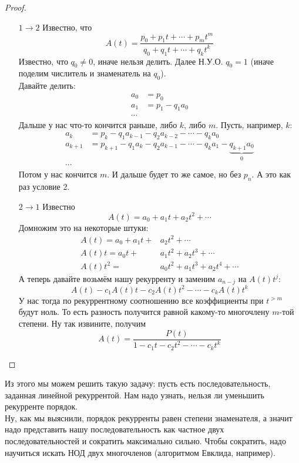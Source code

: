 \documentclass{article}
\begin{document}
    \begin{proof}
        \begin{itemize}
            \item[$1\to2$] Известно, что
            $$
            A(t)=\frac{p_0+p_1t+\cdots+p_mt^m}{q_0+q_1t+\cdots+q_kt^k}
            $$
            Известно, что $q_0\neq0$, иначе нельзя делить. Далее Н.У.О. $q_0=1$ (иначе поделим числитель и знаменатель на $q_0$).\\
            Давайте делить:
            \begin{align*}
                a_0&=p_0\\
                a_1&=p_1-q_1a_0\\
                \cdots&
            \end{align*}
            Дальше у нас что-то кончится раньше, либо $k$, либо $m$. Пусть, например, $k$:
            \begin{align*}
                a_k&=p_k-q_1a_{k-1}-q_2a_{k-2}-\cdots-q_{k}a_0\\
                a_{k+1}&=p_{k+1}-q_1a_{k}-q_2a_{k-1}-\cdots-q_{k}a_1-\underbrace{q_{k+1}a_0}_0\\
                \cdots&
            \end{align*}
            Потом у нас кончится $m$. И дальше будет то же самое, но без $p_n$. А это как раз условие 2.
            \item[$2\to1$] Известно
            $$
            A(t)=a_0+a_1t+a_2t^2+\cdots
            $$
            Домножим это на некоторые штуки:
            \begin{align*}
                A(t)=a_0+a_1t+&a_2t^2+\cdots\\
                A(t)t=a_0t+&a_1t^2+a_2t^3+\cdots\\
                A(t)t^2={}&a_0t^2+a_1t^3+a_2t^4+\cdots
            \end{align*}
            А теперь давайте возьмём нашу рекурренту и заменим $a_{n-j}$ на $A(t)t^j$:
            $$
            A(t)-c_1A(t)t-c_2A(t)t^2-\cdots-c_kA(t)t^k
            $$
            У нас тогда по рекуррентному соотношению все коэффициенты при $t^{>m}$ будут ноль. То есть разность получится равной какому-то многочлену $m$-той степени. Ну так извините, получим
            $$
            A(t)=\frac{P(t)}{1-c_1t-c_2t^2-\cdots-c_kt^k}
            $$
        \end{itemize}
    \end{proof}
    \begin{remark}
        Из этого мы можем решить такую задачу: пусть есть последовательность, заданная линейной рекуррентой. Нам надо узнать, нельзя ли уменьшить рекурренте порядок.\\
        Ну, как мы выяснили, порядок рекурренты равен степени знаменателя, а значит надо представить нашу последовательность как частное двух последовательностей и сократить максимально сильно. Чтобы сократить, надо научиться искать НОД двух многочленов (алгоритмом Евклида, например).
    \end{remark}
\end{document}
